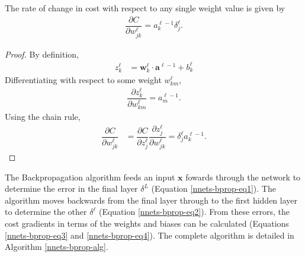 \begin{lemma}
	The rate of change in cost with respect to any single weight value is given by
	\begin{align}\label{nnets-bprop-eq4}
		\dfrac{\partial C}{\partial w_{jk}^\ell} = a_k^{\ell-1}\delta_j^\ell.
	\end{align}
\end{lemma}
\begin{proof}
	By definition,
	\begin{align}
		z_k^\ell & = \mathbf{w}_k^\ell\cdot\mathbf{a}^{\ell-1} + b_k^\ell
	\end{align}
	Differentiating with respect to some weight $w_{km}^\ell$,
	\begin{align}
		\dfrac{\partial z_k^\ell}{\partial w_{km}^\ell} = a_m^{\ell-1}.
	\end{align}
	Using the chain rule,
	\begin{align}	
		\dfrac{\partial C}{\partial w_{jk}^\ell} & = \dfrac{\partial C}{\partial z_j^\ell}\dfrac{\partial z_j^\ell}{\partial w_{jk}^\ell} = \delta_j^\ell a_k^{\ell-1}.
	\end{align}
\end{proof}


The Backpropagation algorithm feeds an input $\mathbf{x}$ fowards through the network to determine the error in the final layer $\delta^L$ (Equation \eqref{nnets-bprop-eq1}).  The algorithm moves backwards from the final layer through to the first hidden layer to determine the other $\delta^\ell$ (Equation \eqref{nnets-bprop-eq2}). From these errors, the cost gradients in terms of the weights and biases can be calculated (Equations \eqref{nnets-bprop-eq3} and \eqref{nnets-bprop-eq4}). The complete algorithm is detailed in Algorithm \ref{nnets-bprop-alg}.


